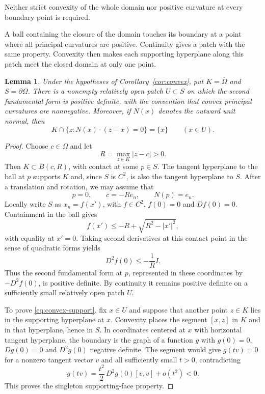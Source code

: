 \documentclass[a4paper,12pt,reqno]{amsart}
\newcommand{\lead}[1]{\par\smallskip\noindent\leavevmode#1\par\smallskip}
\newtheorem{lemma}[theorem]{Lemma}
\theoremstyle{remark}
\numberwithin{equation}{section}
\begin{document}
Neither strict convexity of the whole domain nor positive curvature at
every boundary point is required.

\lead{A ball containing the closure of the domain touches its boundary
at a point where all principal curvatures are positive. Continuity gives
a patch with the same property. Convexity then makes each supporting
hyperplane along this patch meet the closed domain at only one point.}

\begin{lemma}\label{lem:convex-patch}
Under the hypotheses of Corollary~\ref{cor:convex}, put
$K=\overline\Omega$ and $S=\partial\Omega$. There is a nonempty relatively
open patch $U\subset S$ on which the second fundamental form is positive
definite, with the convention that convex principal curvatures are
nonnegative. Moreover, if $N(x)$ denotes the outward unit normal, then
\begin{equation}\label{eq:convex-support}
 K\cap\{z:N(x)\cdot(z-x)=0\}=\{x\}
 \qquad(x\in U).
\end{equation}
\end{lemma}

\begin{proof}
Choose $c\in\Omega$ and let
\[
 R=\max_{z\in K}|z-c|>0.
\]
Then $K\subset\overline B(c,R)$, with contact at some $p\in S$.
The tangent hyperplane to the ball at $p$ supports $K$ and, since $S$
is $C^2$, is also the tangent hyperplane to $S$. After a translation
and rotation, we may assume that
\[
 p=0,\qquad c=-Re_n,\qquad N(p)=e_n.
\]
Locally write $S$ as $x_n=f(x')$, with $f\in C^2$,
$f(0)=0$ and $Df(0)=0$. Containment in the ball gives
\[
 f(x')\leq -R+\sqrt{R^2-|x'|^2},
\]
with equality at $x'=0$. Taking second derivatives at this contact point
in the sense of quadratic forms yields
\[
 D^2f(0)\leq-\frac1R I.
\]
Thus the second fundamental form at $p$, represented in these coordinates
by $-D^2f(0)$, is positive definite. By continuity it remains positive
definite on a sufficiently small relatively open patch $U$.

To prove \eqref{eq:convex-support}, fix $x\in U$ and suppose that another
point $z\in K$ lies in the supporting hyperplane at $x$. Convexity places
the segment $[x,z]$ in $K$ and in that hyperplane, hence in $S$.
In coordinates centered at $x$ with horizontal tangent hyperplane, the
boundary is the graph of a function $g$ with $g(0)=0$, $Dg(0)=0$ and
$D^2g(0)$ negative definite. The segment would give
$g(tv)=0$ for a nonzero tangent vector $v$ and all sufficiently small
$t>0$, contradicting
\[
 g(tv)=\frac{t^2}{2}\,D^2g(0)[v,v]+o(t^2)<0.
\]
This proves the singleton supporting-face property.
\end{proof}
\end{document}
